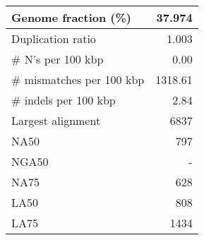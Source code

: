 \documentclass[12pt,a4paper]{article}
\begin{document}
\begin{table}[ht]
\begin{center}
\begin{tabular}{|l*{1}{|r}|}
Genome fraction (\%) & 37.974 \\ \hline
Duplication ratio & 1.003 \\ \hline
\# N's per 100 kbp & 0.00 \\ \hline
\# mismatches per 100 kbp & 1318.61 \\ \hline
\# indels per 100 kbp & 2.84 \\ \hline
Largest alignment & 6837 \\ \hline
NA50 & 797 \\ \hline
NGA50 & - \\ \hline
NA75 & 628 \\ \hline
LA50 & 808 \\ \hline
LA75 & 1434 \\ \hline
\end{tabular}
\end{center}
\end{table}
\end{document}
